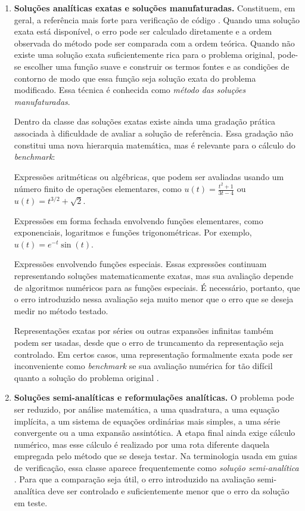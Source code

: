 \begin{enumerate}
\item \textbf{Soluções analíticas exatas e soluções manufaturadas.} Constituem, em geral, a referência mais forte para verificação de código \cite{Roache2002MMS,OberkampfRoy2025}. Quando uma solução exata está disponível, o erro pode ser calculado diretamente e a ordem observada do método pode ser comparada com a ordem teórica. Quando não existe uma solução exata suficientemente rica para o problema original, pode-se escolher uma função suave e construir os termos fontes e as condições de contorno de modo que essa função seja solução exata do problema modificado. Essa técnica é conhecida como \emph{método das soluções manufaturadas}.

Dentro da classe das soluções exatas existe ainda uma gradação prática associada à dificuldade de avaliar a solução de referência. Essa gradação não constitui uma nova hierarquia matemática, mas é relevante para o cálculo do {\it benchmark}:

\subitem Expressões aritméticas ou algébricas, que podem ser avaliadas usando um número finito de operações elementares, como $u(t)=\frac{t^2+1}{3t-4}$ ou $u(t)=t^{3/2}+\sqrt{2}$.

\subitem Expressões em forma fechada envolvendo funções elementares, como exponenciais, logaritmos e funções trigonométricas. Por exemplo, $u(t)=e^{-t}\sin(t)$.

\subitem Expressões envolvendo funções especiais. Essas expressões continuam representando soluções matematicamente exatas, mas sua avaliação depende de algoritmos numéricos para as funções especiais. É necessário, portanto, que o erro introduzido nessa avaliação seja muito menor que o erro que se deseja medir no método testado.

\subitem Representações exatas por séries ou outras expansões infinitas também podem ser usadas, desde que o erro de truncamento da representação seja controlado. Em certos casos, uma representação formalmente exata pode ser inconveniente como {\it benchmark} se sua avaliação numérica for tão difícil quanto a solução do problema original \cite{Roache2002MMS}.

\item \textbf{Soluções semi-analíticas e reformulações analíticas.} O problema pode ser reduzido, por análise matemática, a uma quadratura, a uma equação implícita, a um sistema de equações ordinárias mais simples, a uma série convergente ou a uma expansão assintótica. A etapa final ainda exige cálculo numérico, mas esse cálculo é realizado por uma rota diferente daquela empregada pelo método que se deseja testar. Na terminologia usada em guias de verificação, essa classe aparece frequentemente como \emph{solução semi-analítica} \cite{AIAA1998VV,ASMEVV10}. Para que a comparação seja útil, o erro introduzido na avaliação semi-analítica deve ser controlado e suficientemente menor que o erro da solução em teste.


\end{enumerate}
